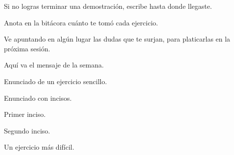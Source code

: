 \documentclass[12pt,a4paper]{article}
\begin{document}
    \encabezado

    \begin{indicaciones}
        \item Si no logras terminar una demostración, escribe hasta donde llegaste.
        \item Anota en la bitácora cuánto te tomó cada ejercicio.
        \item Ve apuntando en algún lugar las dudas que te surjan, para platicarlas en la próxima sesión.
    \end{indicaciones}

    \begin{mensaje}
        Aquí va el mensaje de la semana.
    \end{mensaje}


    \begin{ejercicio}[1]
        Enunciado de un ejercicio sencillo.
    \end{ejercicio}


    \begin{ejercicio}[2]
        Enunciado con incisos.
        \begin{incisos}
            \item Primer inciso.
            \item Segundo inciso.
        \end{incisos}
    \end{ejercicio}


    \begin{ejercicio}[3]
        Un ejercicio más difícil.
    \end{ejercicio}

    \bitacora
\end{document}
